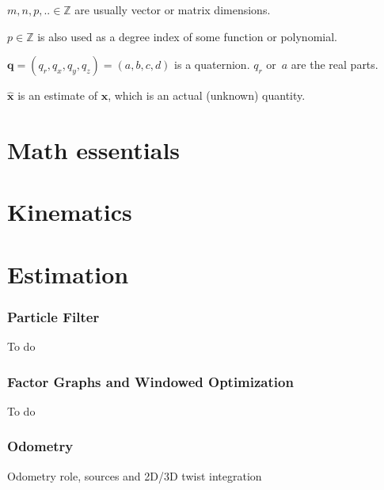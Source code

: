 \documentclass[a4paper,11pt]{article}
\begin{document}
$m,n,p,.. \in \mathbb{Z}$ are usually vector or matrix dimensions.

$p \in \mathbb{Z}$ is also used as a degree index of some function or polynomial. 

$\mathbf{q} = (q_r,q_x,q_y,q_z) = (a,b,c,d)$ is a quaternion. $q_r$ or~$a$ are the real parts.

$\hat{\mathbf{x}}$ is an estimate of $\mathbf{x}$, which is an actual (unknown) quantity.

\newpage
\part{Math essentials}

\newpage


\newpage


\newpage


\newpage


\newpage


%

\newpage


\newpage
\part{Kinematics}

\newpage



\newpage
\part{Estimation}

\newpage



\newpage


\newpage
\section{Particle Filter}
To do

\newpage
\section{Factor Graphs and Windowed Optimization}
To do

\newpage
\section{Odometry}
Odometry role, sources and 2D/3D twist integration
\end{document}

